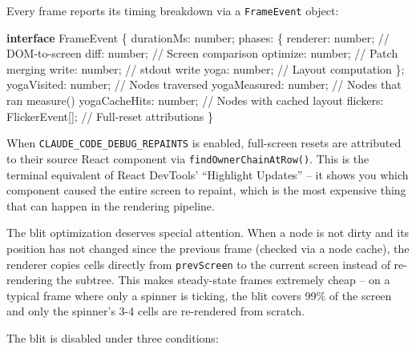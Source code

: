 \documentclass[
  english,
  11pt,
  letterpaper,
]{book}
\newenvironment{Shaded}{\begin{snugshade}}{\end{snugshade}}
\newcommand{\CommentTok}[1]{\textcolor[rgb]{0.37,0.37,0.37}{#1}}
\newcommand{\DataTypeTok}[1]{\textcolor[rgb]{0.68,0.00,0.00}{#1}}
\newcommand{\KeywordTok}[1]{\textcolor[rgb]{0.00,0.23,0.31}{\textbf{#1}}}
\newcommand{\NormalTok}[1]{\textcolor[rgb]{0.00,0.23,0.31}{#1}}
\newcommand{\OperatorTok}[1]{\textcolor[rgb]{0.37,0.37,0.37}{#1}}
\begin{document}
Every frame reports its timing breakdown via a \texttt{FrameEvent}
object:

\begin{Shaded}
\begin{Highlighting}[]
\KeywordTok{interface}\NormalTok{ FrameEvent \{}
\NormalTok{  durationMs}\OperatorTok{:} \DataTypeTok{number}\OperatorTok{;}
\NormalTok{  phases}\OperatorTok{:}\NormalTok{ \{}
\NormalTok{    renderer}\OperatorTok{:} \DataTypeTok{number}\OperatorTok{;}    \CommentTok{// DOM{-}to{-}screen}
\NormalTok{    diff}\OperatorTok{:} \DataTypeTok{number}\OperatorTok{;}        \CommentTok{// Screen comparison}
\NormalTok{    optimize}\OperatorTok{:} \DataTypeTok{number}\OperatorTok{;}    \CommentTok{// Patch merging}
\NormalTok{    write}\OperatorTok{:} \DataTypeTok{number}\OperatorTok{;}       \CommentTok{// stdout write}
\NormalTok{    yoga}\OperatorTok{:} \DataTypeTok{number}\OperatorTok{;}        \CommentTok{// Layout computation}
\NormalTok{  \}}\OperatorTok{;}
\NormalTok{  yogaVisited}\OperatorTok{:} \DataTypeTok{number}\OperatorTok{;}   \CommentTok{// Nodes traversed}
\NormalTok{  yogaMeasured}\OperatorTok{:} \DataTypeTok{number}\OperatorTok{;}  \CommentTok{// Nodes that ran measure()}
\NormalTok{  yogaCacheHits}\OperatorTok{:} \DataTypeTok{number}\OperatorTok{;} \CommentTok{// Nodes with cached layout}
\NormalTok{  flickers}\OperatorTok{:}\NormalTok{ FlickerEvent[]}\OperatorTok{;}  \CommentTok{// Full{-}reset attributions}
\NormalTok{\}}
\end{Highlighting}
\end{Shaded}

When \texttt{CLAUDE\_CODE\_DEBUG\_REPAINTS} is enabled, full-screen
resets are attributed to their source React component via
\texttt{findOwnerChainAtRow()}. This is the terminal equivalent of React
DevTools' ``Highlight Updates'' -- it shows you which component caused
the entire screen to repaint, which is the most expensive thing that can
happen in the rendering pipeline.

The blit optimization deserves special attention. When a node is not
dirty and its position has not changed since the previous frame (checked
via a node cache), the renderer copies cells directly from
\texttt{prevScreen} to the current screen instead of re-rendering the
subtree. This makes steady-state frames extremely cheap -- on a typical
frame where only a spinner is ticking, the blit covers 99\% of the
screen and only the spinner's 3-4 cells are re-rendered from scratch.

The blit is disabled under three conditions:
\end{document}
